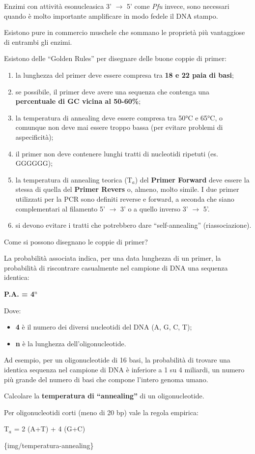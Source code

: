 \documentclass[]{article}
\begin{document}
Enzimi con attività esonucleasica 3' \(\rightarrow\) 5' come \emph{Pfu}
invece, sono necessari quando è molto importante amplificare in modo
fedele il DNA stampo.

Esistono pure in commercio muschele che sommano le proprietà più
vantaggiose di entrambi gli enzimi.

Esistono delle ``Golden Rules'' per disegnare delle buone coppie di
primer:

\begin{enumerate}
\def\labelenumi{\arabic{enumi}.}
\itemsep1pt\parskip0pt
\item
  la lunghezza del primer deve essere compresa tra \textbf{18 e 22 paia
  di basi};
\item
  se possibile, il primer deve avere una sequenza che contenga una
  \textbf{percentuale di GC vicina al 50-60\%};
\item
  la temperatura di annealing deve essere compresa tra 50°C e 65°C, o
  comunque non deve mai essere troppo bassa (per evitare problemi di
  aspecificità);
\item
  il primer non deve contenere lunghi tratti di nucleotidi ripetuti (es.
  GGGGGG);
\item
  la temperatura di annealing teorica (T\(_a\)) del \textbf{Primer
  Forward} deve essere la stessa di quella del \textbf{Primer Revers} o,
  almeno, molto simile. I due primer utilizzati per la PCR sono definiti
  reverse e forward, a seconda che siano complementari al filamento 5'
  \(\rightarrow\) 3' o a quello inverso 3' \(\rightarrow\) 5'.
\item
  si devono evitare i tratti che potrebbero dare ``self-annealing''
  (riassociazione).
\end{enumerate}

Come si possono disegnano le coppie di primer?

La probabilità associata indica, per una data lunghezza di un primer, la
probabilità di riscontrare casualmente nel campione di DNA una sequenza
identica:

\textbf{P.A. = 4\(^n\)}

Dove:

\begin{itemize}
\itemsep1pt\parskip0pt
\item
  \textbf{4} è il numero dei diversi nucleotidi del DNA (A, G, C, T);
\item
  \textbf{n} è la lunghezza dell'oligonucleotide.
\end{itemize}

Ad esempio, per un oligonucleotide di 16 basi, la probabilità di trovare
una identica sequenza nel campione di DNA è inferiore a 1 su 4 miliardi,
un numero più grande del numero di basi che compone l'intero genoma
umano.

Calcolare la \textbf{temperatura di ``annealing''} di un
oligonucleotide.

Per oligonucleotidi corti (meno di 20 bp) vale la regola empirica:

T\(_a\) = 2 (A+T) + 4 (G+C)

\{img/temperatura-annealing\}
\end{document}
